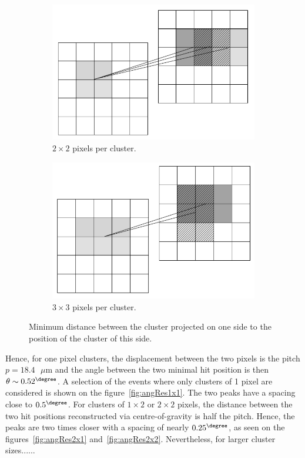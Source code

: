 \begin{figure}[!h]
      \begin{subfigure}[t]{0.45\textwidth}
        \centering
        \includegraphics[width = \textwidth]{Pictures/deformation/cluster_2x2.png}
        \caption{$2 \times 2$ pixels per cluster.}
      \end{subfigure}
      \quad
      \begin{subfigure}[t]{0.45\textwidth}
        \centering
        \includegraphics[width = \textwidth]{Pictures/deformation/cluster_3x3.png}
        \caption{$3 \times 3$ pixels per cluster.}
      \end{subfigure}
      \caption{Minimum distance between the cluster projected on one side to the position of the cluster of this side.}
      \label{fig:clusterSize}
   \end{figure}

   Hence, for one pixel clusters, the displacement between the two pixels is the pitch $p = 18.4 \text{ }\mu\text{m}$ and the angle between the two minimal hit position is then $\theta \sim 0.52^{\degree}$.
   A selection of the events where only clusters of 1 pixel are considered is shown on the figure~\ref{fig:angRes1x1}.
   The two peaks have a spacing close to $0.5^{\degree}$.
   For clusters of $1 \times 2$ or $2 \times 2$ pixels, the distance between the two hit positions reconstructed via centre-of-gravity is half the pitch.
   Hence, the peaks are two times closer with a spacing of nearly $0.25^{\degree}$, as seen on the figures~\ref{fig:angRes2x1} and~\ref{fig:angRes2x2}.
   Nevertheless, for larger cluster sizes......


